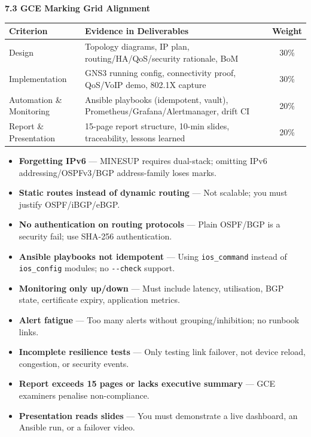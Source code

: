 \documentclass[11pt]{article}
\begin{document}
\begin{exoresolu}
\textbf{7.3 GCE Marking Grid Alignment}
\begin{center}
\begin{tabularx}{\linewidth}{|l|X|c|}
\hline
\rowcolor{popblueL}
\textbf{Criterion} & \textbf{Evidence in Deliverables} & \textbf{Weight} \\
\hline
Design & Topology diagrams, IP plan, routing/HA/QoS/security rationale, BoM & 30\% \\
Implementation & GNS3 running config, connectivity proof, QoS/VoIP demo, 802.1X capture & 30\% \\
Automation \& Monitoring & Ansible playbooks (idempotent, vault), Prometheus/Grafana/Alertmanager, drift CI & 20\% \\
Report \& Presentation & 15-page report structure, 10-min slides, traceability, lessons learned & 20\% \\
\hline
\end{tabularx}
\end{center}
\end{exoresolu}

\begin{attention}
\begin{itemize}
    \item \textbf{Forgetting IPv6} — MINESUP requires dual-stack; omitting IPv6 addressing/OSPFv3/BGP address-family loses marks.
    \item \textbf{Static routes instead of dynamic routing} — Not scalable; you must justify OSPF/iBGP/eBGP.
    \item \textbf{No authentication on routing protocols} — Plain OSPF/BGP is a security fail; use SHA-256 authentication.
    \item \textbf{Ansible playbooks not idempotent} — Using \texttt{ios\_command} instead of \texttt{ios\_config} modules; no \texttt{{-}{-}check} support.
    \item \textbf{Monitoring only up/down} — Must include latency, utilisation, BGP state, certificate expiry, application metrics.
    \item \textbf{Alert fatigue} — Too many alerts without grouping/inhibition; no runbook links.
    \item \textbf{Incomplete resilience tests} — Only testing link failover, not device reload, congestion, or security events.
    \item \textbf{Report exceeds 15 pages or lacks executive summary} — GCE examiners penalise non-compliance.
    \item \textbf{Presentation reads slides} — You must demonstrate a live dashboard, an Ansible run, or a failover video.
\end{itemize}
\end{attention}
\end{document}
